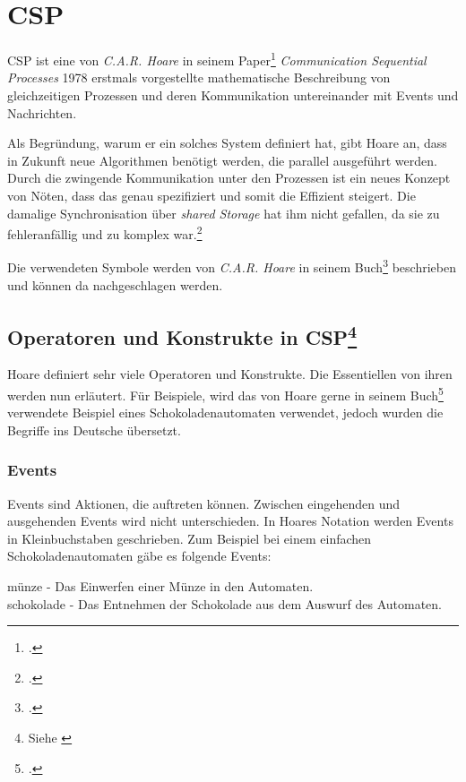 \section{\acl{CSP}}
\acf{CSP} ist eine von \textit{C.A.R. Hoare} in seinem Paper\footcite{CSP} \textit{Communication Sequential Processes} 1978 erstmals vorgestellte mathematische Beschreibung von gleichzeitigen Prozessen und deren Kommunikation untereinander mit Events und Nachrichten.

Als Begründung, warum er ein solches System definiert hat, gibt Hoare an, dass in Zukunft neue Algorithmen benötigt werden, die parallel ausgeführt werden. Durch die zwingende Kommunikation unter den Prozessen ist ein neues Konzept von Nöten, dass das genau spezifiziert und somit die  Effizient steigert. Die damalige Synchronisation über \textit{shared Storage} hat ihm nicht gefallen, da sie zu fehleranfällig und zu komplex war.\footcite[Introduction]{CSP}

Die verwendeten Symbole werden von \textit{C.A.R. Hoare} in seinem Buch\footcite[Glossary of Symbols]{CSPBOOK} beschrieben und können da nachgeschlagen werden.
\subsection[Operatoren und Konstrukte in \acs{CSP}]{Operatoren und Konstrukte in \acs{CSP}\footnote{Siehe \cite[Kapitel 1.1]{CSPBOOK}}}

Hoare definiert sehr viele Operatoren und Konstrukte. Die Essentiellen von ihren werden nun erläutert. Für Beispiele, wird das von Hoare gerne in seinem Buch\footcite{CSPBOOK} verwendete Beispiel eines Schokoladenautomaten verwendet, jedoch wurden die Begriffe ins Deutsche übersetzt.

\subsubsection{Events}
Events sind Aktionen, die auftreten können. Zwischen eingehenden und ausgehenden Events wird nicht unterschieden. In Hoares Notation werden Events in Kleinbuchstaben geschrieben.
Zum Beispiel bei einem einfachen Schokoladenautomaten gäbe es folgende Events:

\begin{addmargin}[1cm]{0cm}
münze - Das Einwerfen einer Münze in den Automaten.\\
schokolade - Das Entnehmen der Schokolade aus dem Auswurf des Automaten.
\end{addmargin}

